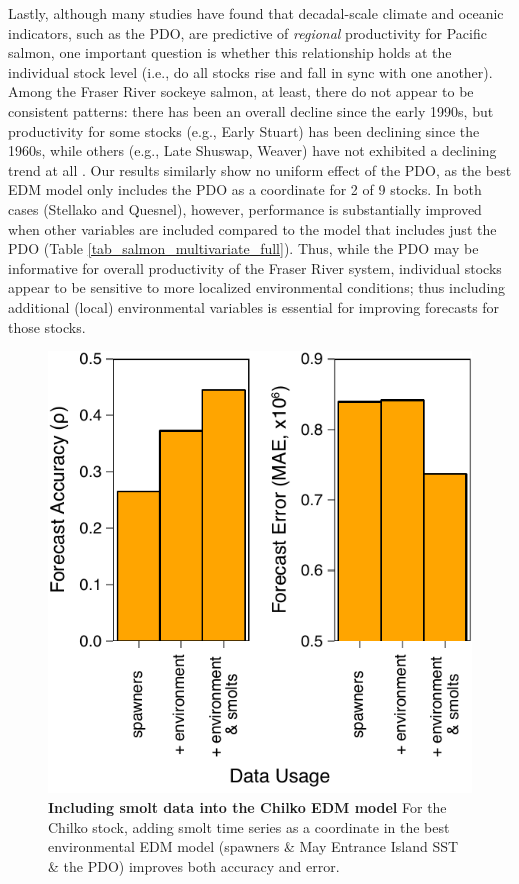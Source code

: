 Lastly, although many studies \cite{Mantua_1997, Beamish_1997, Beamish_2004a} have found that decadal-scale climate and oceanic indicators, such as the PDO, are predictive of \emph{regional} productivity for Pacific salmon, one important question is whether this relationship holds at the individual stock level (i.e., do all stocks rise and fall in sync with one another). Among the Fraser River sockeye salmon, at least, there do not appear to be consistent patterns: there has been an overall decline since the early 1990s, but productivity for some stocks (e.g., Early Stuart) has been declining since the 1960s, while others (e.g., Late Shuswap, Weaver) have not exhibited a declining trend at all \cite{Grant_2010}. Our results similarly show no uniform effect of the PDO, as the best EDM model only includes the PDO as a coordinate for 2 of 9 stocks. In both cases (Stellako and Quesnel), however, performance is substantially improved when other variables are included compared to the model that includes just the PDO (Table \ref{tab_salmon_multivariate_full}). Thus, while the PDO may be informative for overall productivity of the Fraser River system, individual stocks appear to be sensitive to more localized environmental conditions; thus including additional (local) environmental variables is essential for improving forecasts for those stocks.

\begin{figure}[!ht]
\begin{center}\includegraphics[width=\maxwidth{\textwidth}]{fig_salmon_s4.pdf}\end{center}
\caption[Including smolt data into the Chilko EDM model]{\textbf{Including smolt data into the Chilko EDM model}\newline
For the Chilko stock, adding smolt time series as a coordinate in the best environmental EDM model (spawners \& May Entrance Island SST \& the PDO) improves both accuracy and error.}
\label{fig_salmon_chilko_smolt_model}
\end{figure}

